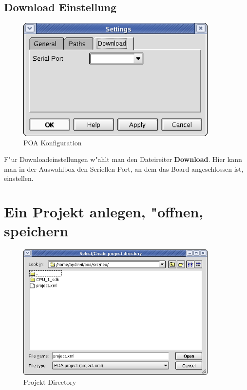 \documentclass[a4paper,titlepage,12pt,ngerman]{scrbook}
\begin{document}
\subsection{Download Einstellung}
\begin{figure}[htbp]

\begin{center}

\includegraphics[width=10cm]{POAConfiguration3}

\caption{POA Konfiguration}\label{test}

\end{center}

\end{figure}
F"ur Downloadeinstellungen w"ahlt man den Dateireiter {\bf Download}. Hier kann man in der Auswahlbox den Seriellen Port, an dem das Board angeschlossen ist, einstellen.\par


\newpage
\section{Ein Projekt anlegen, "offnen, speichern}
\begin{figure}[htbp]

\begin{center}

\includegraphics[width=10cm]{Directory}

\caption{Projekt Directory}\label{test}

\end{center}

\end{figure}
\end{document}
